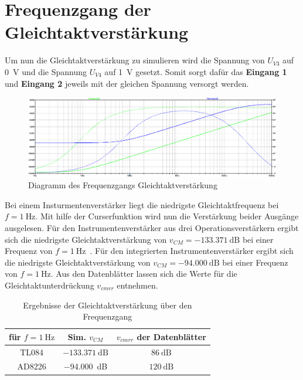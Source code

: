 
    \section{Frequenzgang der Gleichtaktverstärkung}
        Um nun die Gleichtaktverstärkung zu simulieren wird die Spannung von \(U_{V3}\) auf \SI{0}{\V} und die Spannung \(U_{V4}\) auf \SI{1}{\V} gesetzt.
        Somit sorgt dafür das \textbf{Eingang 1} und \textbf{Eingang 2} jeweils mit der gleichen Spannung versorgt werden. 
        \begin{figure}[ht!]
            \centering
            \includegraphics[width=\linewidth]{gleichtakt.png}
            \caption{Diagramm des Frequenzgangs Gleichtaktverstärkung}
        \end{figure}
        Bei einem Insturmentenverstärker liegt die niedrigste Gleichtaktfrequenz bei \(f=\SI{1}{\Hz}\). Mit hilfe der Curserfunktion wird nun die Verstärkung beider Ausgänge ausgelesen. 
        Für den Instrumentenverstärker aus drei Operationsverstärkern ergibt sich die niedrigste Gleichtaktverstärkung von \(v_{CM}=-\SI{133,371}{\dB}\) bei einer Frequenz von \(f=\SI{1}{\Hz}\)~.
        Für den integrierten Instrumentenverstärker ergibt sich die niedrigste Gleichtaktverstärkung von \(v_{CM}=-\SI{94,000}{\dB}\) bei einer Frequenz von \(f=\SI{1}{\Hz}\).
        Aus den Datenblätter lassen sich die Werte für die Gleichtaktunterdrückung \(v_{cmrr}\) entnehmen.
        \begin{table}[h!]
            \centering
            \caption{Ergebnisse der Gleichtaktverstärkung über den Frequenzgang}
            \begin{tabular}{|c|c|c|}
                \hline
                für \(f=\SI{1}{\Hz}\)  & Sim. \(v_{CM}\) & \(v_{cmrr}\) der Datenblätter\\ \hline 
                TL084 & \(\SI{-133,371}{\dB}\)&\(\SI{86}{\dB}\)\\ \hline
                AD8226 & \SI{-94,000}{\dB}&\(\SI{120}{\dB}\)\\ \hline
            \end{tabular}
        \end{table}
